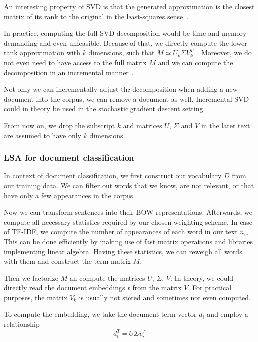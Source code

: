     An interesting property of SVD is that the generated approximation is the closest matrix of its rank to the original in the least-squares sense~\cite{berry1995using}.

    In practice, computing the full SVD decomposition would be time and memory demanding and even unfeasible.
    Because of that, we directly compute the lower rank approximation with $k$ dimensions,
    such that $M \simeq U_k \Sigma V_k^T$~\cite{halko2011finding}. %
    Moreover, we do not even need to have access to the full matrix $M$ and we can compute the decomposition in an incremental manner~\cite{brand2006fast}. %
    
    Not only we can incrementally adjust the decomposition when adding a new document into the corpus, we can remove a document as well.
    Incremental SVD could in theory be used in the stochastic gradient descent setting.
    
    From now on, we drop the subscript $k$ and matrices $U$, $\Sigma$ and $V$ in the later text are assumed to have only $k$ dimensions.
    
    
    \subsubsection{LSA for document classification}
    
    In context of document classification, we first construct our vocabulary $D$ from our training data. 
    We can filter out words that we know, are not relevant, or that have only a few appearances in the corpus.
    
    Now we can transform sentences into their BOW representations.
    Afterwards, we compute all necessary statistics required by our chosen weighting scheme.
    In case of TF-IDF, we compute the number of appearances of each word in our text $n_w$. 
    This can be done efficiently by making use of fast matrix operations and libraries implementing linear algebra.
    Having these statistics, we can reweigh all words with them and construct the term matrix $M$.
    
    Then we factorize $M$ an compute the matrices $U$, $\Sigma$, $V$. 
    In theory, we could directly read the document embeddings $v$ from the matrix $V$.
    For practical purposes, the matrix $V_k$ is usually not stored and sometimes not even computed. 
    
    To compute the embedding, we take the document term vector $d_i$ and employ a relationship $$d_i^T = U \Sigma v_i^T$$
    
